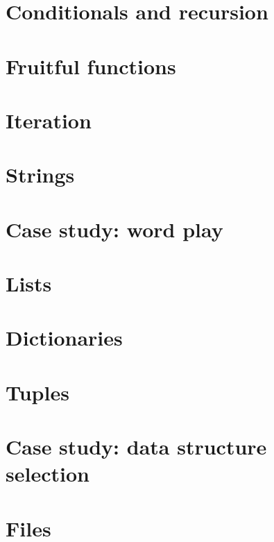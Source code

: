 \documentclass[french,10pt]{book}
\newcommand{\EN}{\color{red} \normalsize}
\begin{document}
\chapter{Conditionals and recursion}

\EN
\chapter{Fruitful functions}
\label{fruitchap}

\EN
\chapter{Iteration}

\EN
\chapter{Strings}
\label{strings}

\EN
\chapter{Case study: word play}

\EN
\chapter{Lists}

\EN
\chapter{Dictionaries}

\EN
\chapter{Tuples}
\label{tuplechap}

\EN
\chapter{Case study: data structure selection}

\EN
\chapter{Files}

\EN
\end{document}
